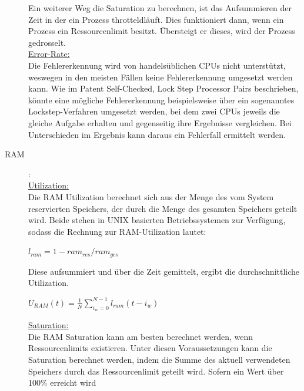 \documentclass[a4paper,10pt]{scrartcl}
\begin{document}
\begin{description}
\begin{minipage}{\linewidth}
\end{minipage}

Ein weiterer Weg die Saturation zu berechnen, ist das Aufsummieren der Zeit in der ein Prozess \glqq throtteld\grqq läuft. Dies funktioniert dann, wenn ein Prozess ein Ressourcenlimit besitzt. Übersteigt er dieses, wird der Prozess gedrosselt.\\
\underline{Error-Rate:}\\
Die Fehlererkennung wird von handelsüblichen CPUs nicht unterstützt, weswegen in den meisten Fällen keine Fehlererkennung umgesetzt werden kann. Wie im Patent Self-Checked, Lock Step Processor Pairs \cite{patent} beschrieben, könnte eine mögliche Fehlererkennung beispielsweise über ein sogenanntes Lockstep-Verfahren umgesetzt werden, bei dem zwei CPUs jeweils die gleiche Aufgabe erhalten und gegenseitig ihre Ergebnisse vergleichen. Bei Unterschieden im Ergebnis kann daraus ein Fehlerfall ermittelt werden.
\item[RAM]:\\
\underline{Utilization:}\\
Die RAM Utilization berechnet sich aus der Menge des vom System reservierten Speichers, der durch die Menge des gesamten Speichers geteilt wird. Beide stehen in UNIX basierten Betriebssystemen zur Verfügung, sodass die Rechnung zur RAM-Utilization lautet:\\

\begin{minipage}{\linewidth}
\(
\displaystyle{l_{ram}=1-ram_{res}/ram_{ges}}
\) 

\end{minipage}

Diese aufsummiert und über die Zeit gemittelt, ergibt die durchschnittliche Utilization.\\

\begin{minipage}{\linewidth}
\(
\displaystyle{U_{RAM}(t)=\frac{1}{N}{\sum\limits_{i_{w}=0}^{N-1} l_{ram}{(t-i_{w})}} }
\) 
\\
\end{minipage}

\pagebreak

\underline{Saturation:}\\
Die RAM Saturation kann am besten berechnet werden, wenn Ressourcenlimits existieren. Unter diesen Voraussetzungen kann die Saturation berechnet werden, indem die Summe des aktuell verwendeten Speichers durch das Ressourcenlimit geteilt wird. Sofern ein Wert über 100\% erreicht wird\\


\end{description}
\end{document}
